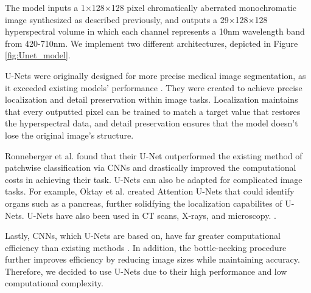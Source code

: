 \documentclass{article}
\begin{document}
The model inputs a 1×128×128 pixel chromatically aberrated monochromatic image synthesized as described previously, and outputs a 29×128×128 hyperspectral volume in which each channel represents a 10nm wavelength band from 420-710nm. We implement two different architectures, depicted in Figure \ref{fig:Unet_model}. 

U-Nets were originally designed for more precise medical image segmentation, as it exceeded existing models' performance \cite{ronneberger2015u}. They were created to achieve precise localization and detail preservation within image tasks. Localization maintains that every outputted pixel can be trained to match a target value that restores the hyperspectral data, and detail preservation ensures that the model doesn't lose the original image's structure. 

Ronneberger et al. \cite{Ronneberger_2018} found that their U-Net outperformed the existing method of patchwise classification via CNNs and drastically improved the computational costs in achieving their task. U-Nets can also be adapted for complicated image tasks. For example, Oktay et al. \cite{oktay2018attention} created Attention U-Nets that could identify organs such as a pancreas, further solidfying the localization capabilites of U-Nets. U-Nets have also been used in CT scans, X-rays, and microscopy. \cite{siddique2021u}.

Lastly, CNNs, which U-Nets are based on, have far greater computational efficiency than existing methods \cite{yang2018hyperspectral}. In addition, the bottle-necking procedure further improves efficiency by reducing image sizes while maintaining accuracy. Therefore, we decided to use U-Nets due to their high performance and low computational complexity.
\end{document}
